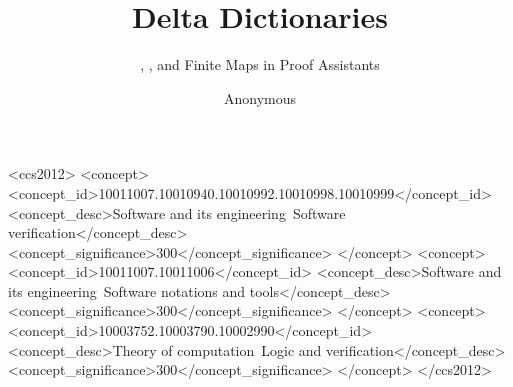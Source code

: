 \documentclass[sigplan,10pt,review]{acmart}
\begin{document}



\title{Delta Dictionaries}
\subtitle{\total, \extensional, and \destructible{} Finite Maps in Proof Assistants}

\author{Anonymous}






\begin{CCSXML}
<ccs2012>
   <concept>
       <concept_id>10011007.10010940.10010992.10010998.10010999</concept_id>
       <concept_desc>Software and its engineering~Software verification</concept_desc>
       <concept_significance>300</concept_significance>
       </concept>
   <concept>
       <concept_id>10011007.10011006</concept_id>
       <concept_desc>Software and its engineering~Software notations and
tools</concept_desc>
       <concept_significance>300</concept_significance>
       </concept>
   <concept>
       <concept_id>10003752.10003790.10002990</concept_id>
       <concept_desc>Theory of computation~Logic and verification</concept_desc>
       <concept_significance>300</concept_significance>
       </concept>
 </ccs2012>
\end{CCSXML}

\end{document}
